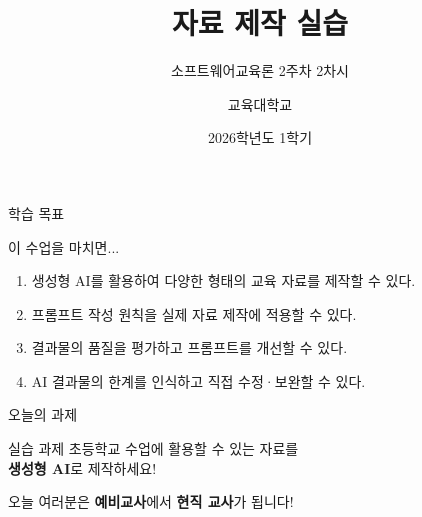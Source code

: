 \documentclass[aspectratio=169, 11pt]{beamer}
\title{자료 제작 실습}
\subtitle{소프트웨어교육론 2주차 2차시}
\author{교육대학교}
\date{2026학년도 1학기}
\institute{}
\begin{document}
\begin{frame}
\titlepage
\end{frame}

\begin{frame}{학습 목표}
\begin{block}{ 이 수업을 마치면...}
\begin{enumerate}
  \item 생성형 AI를 활용하여 다양한 형태의 교육 자료를 제작할 수 있다.
  \item 프롬프트 작성 원칙을 실제 자료 제작에 적용할 수 있다.
  \item 결과물의 품질을 평가하고 프롬프트를 개선할 수 있다.
  \item AI 결과물의 한계를 인식하고 직접 수정·보완할 수 있다.
\end{enumerate}
\end{block}
\end{frame}

\begin{frame}{오늘의 과제}
\begin{alertblock}{ 실습 과제}
\centering
\Large
초등학교 수업에 활용할 수 있는 자료를\\
\textbf{생성형 AI}로 제작하세요!
\end{alertblock}

\vspace{0.5cm}

\begin{center}
 오늘 여러분은 \textbf{예비교사}에서 \textbf{현직 교사}가 됩니다!
\end{center}
\end{frame}
\end{document}

